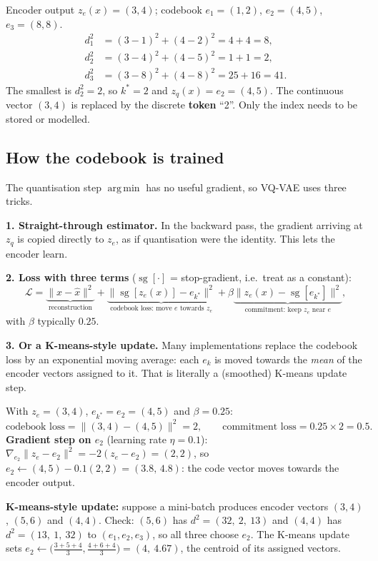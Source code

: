 \documentclass[11pt,a4paper]{article}
\newcommand{\sg}{\operatorname{sg}}
\DeclareMathOperator*{\argmin}{arg\,min}
\begin{document}
\begin{example}
Encoder output $z_e(x)=(3,4)$; codebook $e_1=(1,2)$, $e_2=(4,5)$, $e_3=(8,8)$.
\begin{align*}
d_1^2&=(3-1)^2+(4-2)^2=4+4=8,\\
d_2^2&=(3-4)^2+(4-5)^2=1+1=2,\\
d_3^2&=(3-8)^2+(4-8)^2=25+16=41.
\end{align*}
The smallest is $d_2^2=2$, so $k^\ast=2$ and $z_q(x)=e_2=(4,5)$. The continuous vector $(3,4)$ is replaced by the discrete \textbf{token} ``2''. Only the index needs to be stored or modelled.
\end{example}

\subsection{How the codebook is trained}

The quantisation step $\argmin$ has no useful gradient, so VQ-VAE uses three tricks.

\textbf{1. Straight-through estimator.} In the backward pass, the gradient arriving at $z_q$ is copied directly to $z_e$, as if quantisation were the identity. This lets the encoder learn.

\textbf{2. Loss with three terms} ($\sg[\cdot]$ = stop-gradient, i.e.\ treat as a constant):
\[
\mathcal{L}=\underbrace{\|x-\hat x\|^2}_{\text{reconstruction}}
+\underbrace{\|\sg[z_e(x)]-e_{k^\ast}\|^2}_{\text{codebook loss: move }e\text{ towards }z_e}
+\beta\underbrace{\|z_e(x)-\sg[e_{k^\ast}]\|^2}_{\text{commitment: keep }z_e\text{ near }e},
\]
with $\beta$ typically $0.25$.

\textbf{3. Or a K-means-style update.} Many implementations replace the codebook loss by an exponential moving average: each $e_k$ is moved towards the \emph{mean} of the encoder vectors assigned to it. That is literally a (smoothed) K-means update step.

\begin{example}
With $z_e=(3,4)$, $e_{k^\ast}=e_2=(4,5)$ and $\beta=0.25$:
\[
\text{codebook loss}=\|(3,4)-(4,5)\|^2=2,\qquad\text{commitment loss}=0.25\times2=0.5.
\]
\textbf{Gradient step on $e_2$} (learning rate $\eta=0.1$): $\nabla_{e_2}\|z_e-e_2\|^2=-2(z_e-e_2)=(2,2)$, so
$e_2\leftarrow(4,5)-0.1(2,2)=(3.8,\,4.8)$: the code vector moves towards the encoder output.

\textbf{K-means-style update:} suppose a mini-batch produces encoder vectors $(3,4)$, $(5,6)$ and $(4,4)$. Check: $(5,6)$ has $d^2=(32,\ 2,\ 13)$ and $(4,4)$ has $d^2=(13,\ 1,\ 32)$ to $(e_1,e_2,e_3)$, so all three choose $e_2$. The K-means update sets
$e_2\leftarrow\big(\tfrac{3+5+4}{3},\tfrac{4+6+4}{3}\big)=(4,\ 4.67)$, the centroid of its assigned vectors.
\end{example}
\end{document}

